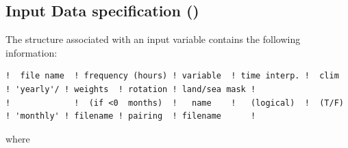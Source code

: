 \subsection{Input Data specification ()}
\label{SBC_fldread}

The structure associated with an input variable contains the following information:
\begin{alltt}  {{\tiny    
\begin{verbatim}
!  file name  ! frequency (hours) ! variable  ! time interp. !  clim  ! 'yearly'/ ! weights  ! rotation ! land/sea mask ! 
!             !  (if <0  months)  !   name    !   (logical)  !  (T/F) ! 'monthly' ! filename ! pairing  ! filename      !
\end{verbatim}
}}\end{alltt} 
where 
